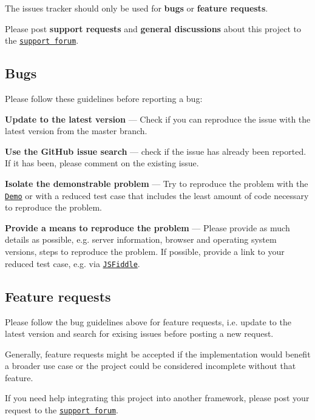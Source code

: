 The issues tracker should only be used for {\bfseries bugs} or {\bfseries feature requests}.

Please post {\bfseries support requests} and {\bfseries general discussions} about this project to the \href{https://groups.google.com/d/forum/jquery-fileupload}{\tt support forum}.

\subsection*{Bugs}

Please follow these guidelines before reporting a bug\-:


\begin{DoxyEnumerate}
\item {\bfseries Update to the latest version} --- Check if you can reproduce the issue with the latest version from the {\ttfamily master} branch.
\item {\bfseries Use the Git\-Hub issue search} --- check if the issue has already been reported. If it has been, please comment on the existing issue.
\item {\bfseries Isolate the demonstrable problem} --- Try to reproduce the problem with the \href{http://blueimp.github.io/jQuery-File-Upload/}{\tt Demo} or with a reduced test case that includes the least amount of code necessary to reproduce the problem.
\item {\bfseries Provide a means to reproduce the problem} --- Please provide as much details as possible, e.\-g. server information, browser and operating system versions, steps to reproduce the problem. If possible, provide a link to your reduced test case, e.\-g. via \href{http://jsfiddle.net/}{\tt J\-S\-Fiddle}.
\end{DoxyEnumerate}

\subsection*{Feature requests}

Please follow the bug guidelines above for feature requests, i.\-e. update to the latest version and search for exising issues before posting a new request.

Generally, feature requests might be accepted if the implementation would benefit a broader use case or the project could be considered incomplete without that feature.

If you need help integrating this project into another framework, please post your request to the \href{https://groups.google.com/d/forum/jquery-fileupload}{\tt support forum}.

